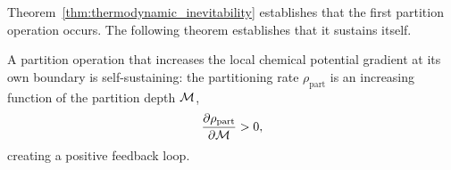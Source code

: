 Theorem~\ref{thm:thermodynamic_inevitability} establishes that the first
partition operation occurs. The following theorem establishes that it sustains
itself.

\begin{theorem}
\label{thm:partition_autocatalysis}
A partition operation that increases the local chemical potential gradient
at its own boundary is self-sustaining: the partitioning rate $\rho_{\mathrm{part}}$
is an increasing function of the partition depth $\mathcal{M}$,
\begin{equation}
  \frac{\partial \rho_{\mathrm{part}}}{\partial \mathcal{M}} > 0,
  \label{eq:autocatalysis_condition}
\end{equation}
creating a positive feedback loop.
\end{theorem}

